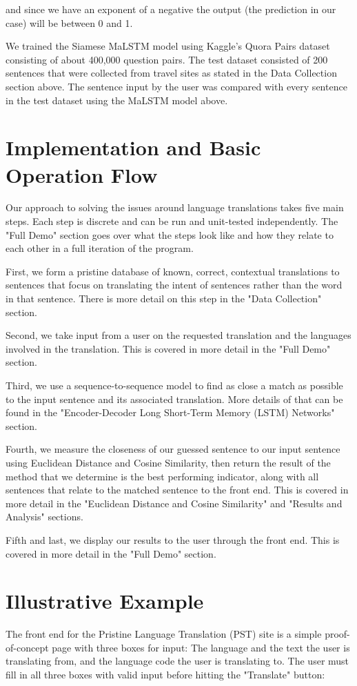 \documentclass[runningheads]{llncs}
\begin{document}
	and since we have an exponent of a negative the output (the prediction in our case) will be between 0 and 1.
	
	We trained the Siamese  MaLSTM model using Kaggle's Quora Pairs dataset~\cite{ref_url25} consisting of about 400,000 question pairs. The test dataset consisted of 200 sentences that were collected from travel sites as stated in the Data Collection section above. The sentence input by the user was compared with every sentence in the test dataset using the MaLSTM model above.

	\section{Implementation and Basic Operation Flow}
	Our approach to solving the issues around language translations takes five main steps. Each step is discrete and can be run and unit-tested independently. The "Full Demo" section goes over what the steps look like and how they relate to each other in a full iteration of the program. 

	First, we form a pristine database of known, correct, contextual translations to sentences that focus on translating the intent of sentences rather than the word in that sentence. There is more detail on this step in the "Data Collection" section. 

	Second, we take input from a user on the requested translation and the languages involved in the translation. This is covered in more detail in the "Full Demo" section. 

	Third, we use a sequence-to-sequence model to find as close a match as possible to the input sentence and its associated translation.  More details of that can be found in the "Encoder-Decoder Long Short-Term Memory (LSTM) Networks" section. 

	Fourth, we measure the closeness of our guessed sentence to our input sentence using Euclidean Distance and Cosine Similarity, then return the result of the method that we determine is the best performing indicator, along with all sentences that relate to the matched sentence to the front end. This is covered in more detail in the "Euclidean Distance and Cosine Similarity" and "Results and Analysis" sections.

	Fifth and last, we display our results to the user through the front end. This is covered in more detail in the "Full Demo" section.
	
	
	\section{Illustrative Example}
	The front end for the Pristine Language Translation (PST) site is a simple proof-of-concept page with three boxes for input: The language and the text the user is translating from, and the language code the user is translating to. The user must fill in all three boxes with valid input before hitting the "Translate" button:
\end{document}

